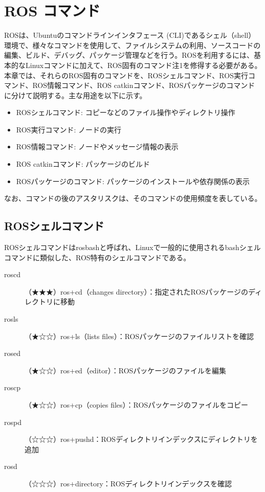 
\chapter{ROS コマンド}

ROSは、Ubuntuのコマンドラインインタフェース (CLI)であるシェル（shell）環境で、様々なコマンドを使用して、ファイルシステムの利用、ソースコードの編集、ビルド、デバッグ、パッケージ管理などを行う。ROSを利用するには、基本的なLinuxコマンドに加えて、ROS固有のコマンド注1を修得する必要がある。本章では、それらのROS固有のコマンドを、ROSシェルコマンド、ROS実行コマンド、ROS情報コマンド、ROS catkinコマンド、ROSパッケージのコマンドに分けて説明する。主な用途を以下に示す。

\begin{itemize}
\item ROSシェルコマンド: コピーなどのファイル操作やディレクトリ操作
\item ROS実行コマンド: ノードの実行
\item ROS情報コマンド: ノードやメッセージ情報の表示
\item ROS catkinコマンド: パッケージのビルド
\item ROSパッケージのコマンド: パッケージのインストールや依存関係の表示
\end{itemize}

なお、コマンドの後のアスタリスクは、そのコマンドの使用頻度を表している。

\section{ROSシェルコマンド}

ROSシェルコマンドはrosbashと呼ばれ、Linuxで一般的に使用されるbashシェルコマンドに類似した、ROS特有のシェルコマンドである。

\vspace{\baselineskip}
\noindent
\begin{description}
\item[roscd]（★★★）ros+cd（changes directory）：指定されたROSパッケージのディレクトリに移動
\item[rosls] （★☆☆）ros+ls（lists files）：ROSパッケージのファイルリストを確認
\item[rosed]（★☆☆）ros+ed（editor）：ROSパッケージのファイルを編集
\item[roscp] （★☆☆）ros+cp（copies files）：ROSパッケージのファイルをコピー
\item[rospd]（☆☆☆）ros+pushd：ROSディレクトリインデックスにディレクトリを追加
\item[rosd]（☆☆☆）ros+directory：ROSディレクトリインデックスを確認
\end{description}

